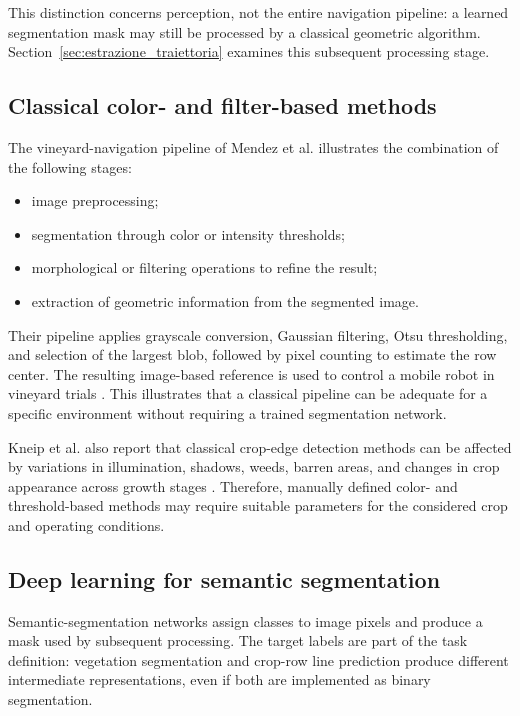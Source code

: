 This distinction concerns perception, not the entire navigation pipeline:
a learned segmentation mask may still be processed by a classical
geometric algorithm. Section~\ref{sec:estrazione_traiettoria} examines
this subsequent processing stage.

\subsection{Classical color- and filter-based methods}
\label{subsec:metodi_classici_colore}

The vineyard-navigation pipeline of Mendez et al. illustrates the
combination of the following stages:
\begin{itemize}
    \item image preprocessing;
    \item segmentation through color or intensity thresholds;
    \item morphological or filtering operations to refine the result;
    \item extraction of geometric information from the segmented image.
\end{itemize}

Their pipeline applies grayscale conversion,
Gaussian filtering, Otsu thresholding, and selection of the largest blob,
followed by pixel counting to estimate the row center. The resulting
image-based reference is used to control a mobile robot in vineyard
trials \cite[Sections~3.4--4]{mendez2023vineyards}. This illustrates that a classical
pipeline can be adequate for a specific environment without requiring a
trained segmentation network.

Kneip et al. also report that classical crop-edge detection methods can
be affected by variations in illumination, shadows, weeds, barren areas,
and changes in crop appearance across growth stages
\cite[Section~2]{kneip2020cropedge}. Therefore, manually defined color- and
threshold-based methods may require suitable parameters for the
considered crop and operating conditions.

\subsection{Deep learning for semantic segmentation}
\label{subsec:deep_learning_segmentazione}

Semantic-segmentation networks assign classes to image pixels and produce
a mask used by subsequent processing. The target labels are part of the
task definition: vegetation segmentation and crop-row line prediction
produce different intermediate representations, even if both are
implemented as binary segmentation.

